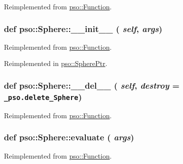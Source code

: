 Reimplemented from \hyperlink{classpso_1_1Function_959f07a6de4f333461fdb0261e6c25ae}{pso::Function}.\hypertarget{classpso_1_1Sphere_e4b014b1b87400b7a6a35b5f2311620a}{
\subsubsection{\setlength{\rightskip}{0pt plus 5cm}def pso::Sphere::\_\-\_\-init\_\-\_\- ( {\em self}, \/   {\em args})}}
\label{classpso_1_1Sphere_e4b014b1b87400b7a6a35b5f2311620a}




Reimplemented from \hyperlink{classpso_1_1Function_6874097c6476dc85af64b40e76a807e9}{pso::Function}.

Reimplemented in \hyperlink{classpso_1_1SpherePtr_5ce4f7ba2467b0c1a36992cbe1bd7e4d}{pso::SpherePtr}.\hypertarget{classpso_1_1Sphere_71a5156269bbb4a9ccc41410990e5dcb}{
\subsubsection{\setlength{\rightskip}{0pt plus 5cm}def pso::Sphere::\_\-\_\-del\_\-\_\- ( {\em self}, \/   {\em destroy} = {\tt \_\-pso.delete\_\-Sphere})}}
\label{classpso_1_1Sphere_71a5156269bbb4a9ccc41410990e5dcb}




Reimplemented from \hyperlink{classpso_1_1Function_c80bd40fcf4a956e5732ed099bccc598}{pso::Function}.\hypertarget{classpso_1_1Sphere_2c17788061780a2050cebccfec6a49c7}{
\subsubsection{\setlength{\rightskip}{0pt plus 5cm}def pso::Sphere::evaluate ( {\em args})}}
\label{classpso_1_1Sphere_2c17788061780a2050cebccfec6a49c7}




Reimplemented from \hyperlink{classpso_1_1Function_7c958ea6d942a89ae219b872b4d73541}{pso::Function}.

